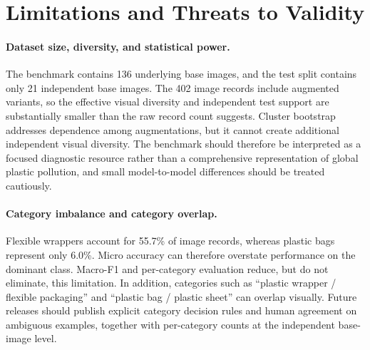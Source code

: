 \documentclass{article}
\begin{document}

\section{Limitations and Threats to Validity}
\label{sec:limitations}
% 

\paragraph{Dataset size, diversity, and statistical power.}
The benchmark contains 136 underlying base images, and the test split contains only 21 independent base images. The 402 image records include augmented variants, so the effective visual diversity and independent test support are substantially smaller than the raw record count suggests. Cluster bootstrap addresses dependence among augmentations, but it cannot create additional independent visual diversity. The benchmark should therefore be interpreted as a focused diagnostic resource rather than a comprehensive representation of global plastic pollution, and small model-to-model differences should be treated cautiously.

\paragraph{Category imbalance and category overlap.}
Flexible wrappers account for 55.7\% of image records, whereas plastic bags represent only 6.0\%. Micro accuracy can therefore overstate performance on the dominant class. Macro-F1 and per-category evaluation reduce, but do not eliminate, this limitation. In addition, categories such as ``plastic wrapper / flexible packaging'' and ``plastic bag / plastic sheet'' can overlap visually. Future releases should publish explicit category decision rules and human agreement on ambiguous examples, together with per-category counts at the independent base-image level.
\end{document}
